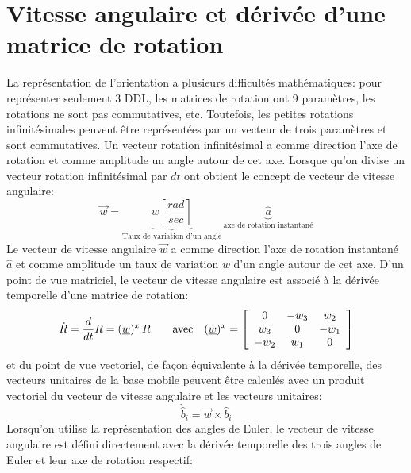 \newpage
\section{Vitesse angulaire et dérivée d'une matrice de rotation}
\label{sec:angularspeed}

La représentation de l'orientation a plusieurs difficultés mathématiques: pour représenter seulement 3 DDL, les matrices de rotation ont 9 paramètres, les rotations ne sont pas commutatives, etc. Toutefois, les petites rotations infinitésimales peuvent être représentées par un vecteur de trois paramètres et sont commutatives. Un vecteur rotation infinitésimal a comme direction l'axe de rotation et comme amplitude un angle autour de cet axe. Lorsque qu'on divise un vecteur rotation infinitésimal par $dt$ ont obtient le concept de vecteur de vitesse angulaire:
\begin{equation}
	\vec{w} = \underbrace{
		w \left[ \frac{rad}{sec} \right]
	}_{\text{Taux de variation d'un angle}}
	\,
	\underbrace{
		\hat{a}
	}_{\text{axe de rotation instantané}}
\end{equation}
Le vecteur de vitesse angulaire $\vec{w}$ a comme direction l'axe de rotation instantané  $\hat{a}$ et comme amplitude un taux de variation $w$ d'un angle autour de cet axe. D'un point de vue matriciel, le vecteur de vitesse angulaire est associé à la dérivée temporelle d'une matrice de rotation:
\begin{equation}
	\dot{R} = \frac{d}{dt} R = (\underline{w})^x \, R   \quad \quad \text{avec} \quad
	(\underline{w})^x =
	\left[ \begin{array}{c c c}
			   0    & -w_3 & w_2 \\
			   w_3  & 0    & -w_1 \\
			   -w_2 & w_1  & 0
	\end{array}  \right]
\end{equation}
et du point de vue vectoriel, de façon équivalente à la dérivée temporelle, des vecteurs unitaires de la base mobile peuvent être calculés avec un produit vectoriel du vecteur de vitesse angulaire et les vecteurs unitaires:
\begin{equation}
	\dot{\hat{b}}_i = \vec{w} \times \hat{b}_i
\end{equation}
Lorsqu'on utilise la représentation des angles de Euler, le vecteur de vitesse angulaire est défini directement avec la dérivée temporelle des trois angles de Euler et leur axe de rotation respectif:
